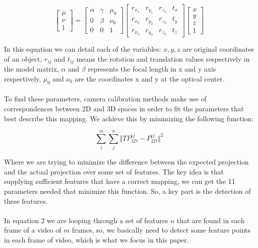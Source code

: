 \documentclass[journal]{IEEEtran}
\begin{document}
\begin{equation}
  \begin{bmatrix}
    \mu \\
    \nu \\
      1 
  \end{bmatrix} = 
  \begin{bmatrix}
    \alpha & \gamma & \mu_{0} \\
       0   & \beta  & \nu_{0} \\
       0   &    0   &    1
  \end{bmatrix} 
  \begin{bmatrix}
    r_{x_{1}} & r_{y_{1}} & r_{z_{1}} & t_{x}\\
    r_{x_{2}} & r_{y_{2}} & r_{z_{2}} & t_{y}\\
    r_{x_{3}} & r_{y_{3}} & r_{z_{3}} & t_{z}
  \end{bmatrix} 
  \begin{bmatrix}
    x \\
    y \\
    z \\
    1
  \end{bmatrix}
%
\end{equation}

In this equation we can detail each of the variables: $x,y,z$ are original coordinates of an object, $r_{ij}$ and $t_{ij}$ means the rotation and translation values respectively in the model matrix, $\alpha$ and $\beta$ represents the focal length in x and y axis respectively, $\mu_0$ and $\nu_0$ are the coordinates x and y at the optical center.
\\
\\
To find these parameters, camera calibration methods make use of correspondences between 2D and 3D spaces in order to fit the parameters that best describe this mapping. We achieve this by minimizing the following function:

\begin{equation}
  \sum^{m}_{i} \sum^{n}_{j} \Vert TP^{ij}_{3D} - P^{ij}_{2D} \Vert^{2}
\end{equation}

Where we are trying to minimize the difference between the expected projection and the actual projection over some set of features. The key idea is that supplying sufficient features that have a correct mapping, we can get the 11 parameters needed that minimize this function. So, a key part is the detection of these features.
\\
\\
In equation $2$ we are looping through a set of features $n$ that are found in each frame of a video of $m$ frames, so, we basically need to detect some feature points in each frame of video, which is what we focus in this paper.
\end{document}

